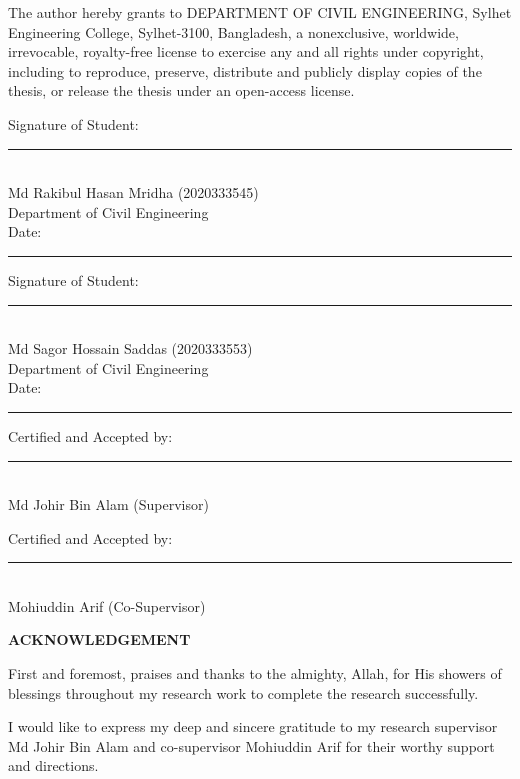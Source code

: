 \documentclass[12pt,a4paper]{article}
\begin{document}
\vspace{2\baselineskip}

\noindent The author hereby grants to DEPARTMENT OF CIVIL ENGINEERING, Sylhet Engineering College, Sylhet-3100, Bangladesh, a nonexclusive, worldwide, irrevocable, royalty-free license to exercise any and all rights under copyright, including to reproduce, preserve, distribute and publicly display copies of the thesis, or release the thesis under an open-access license.

\vspace{2cm}

\noindent Signature of Student: \rule{8cm}{0.5pt}\\[0.2cm]
Md Rakibul Hasan Mridha (2020333545)\\[0.2cm]
Department of Civil Engineering\\[0.2cm]
Date: \rule{4cm}{0.5pt}

\vspace{1.5cm}

\noindent Signature of Student: \rule{8cm}{0.5pt}\\[0.2cm]
Md Sagor Hossain Saddas (2020333553)\\[0.2cm]
Department of Civil Engineering\\[0.2cm]
Date: \rule{4cm}{0.5pt}

\vspace{1.5cm}

\noindent Certified and Accepted by: \rule{8cm}{0.5pt}\\[0.2cm]
Md Johir Bin Alam (Supervisor)\\[0.2cm]

\vspace{1cm}

\noindent Certified and Accepted by: \rule{8cm}{0.5pt}\\[0.2cm]
Mohiuddin Arif (Co-Supervisor)

\newpage
{}
{}
\begin{center}
    \textbf{\Large ACKNOWLEDGEMENT}
\end{center}
\vspace{2\baselineskip}

\noindent First and foremost, praises and thanks to the almighty, Allah, for His showers of blessings throughout my research work to complete the research successfully.

I would like to express my deep and sincere gratitude to my research supervisor Md Johir Bin Alam and co-supervisor Mohiuddin Arif for their worthy support and directions.
\end{document}
